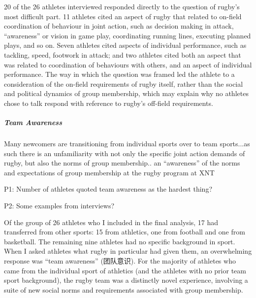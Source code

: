 \begin{CJK}{UTF8}{gbsn}

20 of the 26 athletes interviewed responded directly to the question of rugby's most difficult part.  11 athletes cited an aspect of rugby that related to on-field coordination of behaviour in joint action, such as decision making in attack, ``awareness'' or vision in game play, coordinating running lines, executing planned plays, and so on.  Seven athletes cited aspects of individual performance, such as tackling, speed, footwork in attack; and two athletes cited both an aspect that was related to coordination of behaviours with others, and an aspect of individual performance.  The way in which the question was framed led the athlete to a consideration of the on-field requirements of rugby itself, rather than the social and political dynamics of group membership, which may explain why no athletes chose to talk respond with reference to rugby's off-field requirements.



            \subparagraph{Team Awareness}

            Many newcomers are transitioning from individual sports over to team sports...as such there is an unfamiliarity with not only the specific joint action demands of rugby, but also the norms of group membership.. an ``awareness'' of the norms and expectations of group membership at the rugby program at XNT

          P1: %
          Number of athletes quoted team awareness as the hardest thing?

          P2: %
          Some examples from interviews?



          Of the group of 26 athletes who I included in the final analysis, 17 had transferred from other sports: 15 from athletics, one from football and one from basketball.  The remaining nine athletes had no specific background in sport.  When I asked athletes what rugby in particular had given them, an overwhelming response was ``team awareness'' (团队意识).  For the majority of athletes who came from the individual sport of athletics (and the athletes with no prior team sport background), the rugby team was a distinctly novel experience, involving a suite of new social norms and requirements associated with group membership.


\end{CJK}
